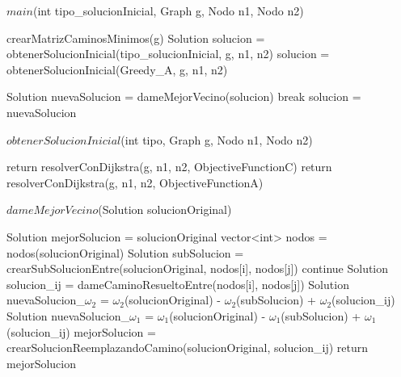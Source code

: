 \begin{algorithm}[H]
\caption{$main$(int tipo\_solucionInicial, Graph g, Nodo n1, Nodo n2)}
\begin{algorithmic}[1]
  \State crearMatrizCaminosMinimos(g)
  \State Solution solucion = obtenerSolucionInicial(tipo\_solucionInicial, g, n1, n2)
    solucion = obtenerSolucionInicial(Greedy\_A, g, n1, n2)
  \EndIf
  
    	\State Solution nuevaSolucion = dameMejorVecino(solucion)
		\State break	
	\EndIf    
	\State solucion = nuevaSolucion	
    \EndWhile
  \EndIf
\end{algorithmic}
\end{algorithm}

\begin{algorithm}[H]
\caption{$obtenerSolucionInicial$(int tipo, Graph g, Nodo n1, Nodo n2)}
\begin{algorithmic}[1]
	\State return resolverConDijkstra(g, n1, n2, ObjectiveFunctionC)
  \EndIf
  \State return resolverConDijkstra(g, n1, n2, ObjectiveFunctionA)
\end{algorithmic}
\end{algorithm}

\begin{algorithm}[H]
\caption{$dameMejorVecino$(Solution solucionOriginal)}
\begin{algorithmic}[1]	
	  \State Solution mejorSolucion = solucionOriginal
	  \State vector<int> nodos = nodos(solucionOriginal)
			\State Solution subSolucion = crearSubSolucionEntre(solucionOriginal, nodos[i], nodos[j])
				\State continue
			\EndIf
			\State Solution solucion\_ij = dameCaminoResueltoEntre(nodos[i], nodos[j])
			\State Solution nuevaSolucion\_$\omega_2$ = $\omega_2$(solucionOriginal) - $\omega_2$(subSolucion) + $\omega_2$(solucion\_ij)
			\State Solution nuevaSolucion\_$\omega_1$ = $\omega_1$(solucionOriginal) - $\omega_1$(subSolucion) + $\omega_1$(solucion\_ij)			
				\State mejorSolucion = crearSolucionReemplazandoCamino(solucionOriginal, solucion\_ij)
			\EndIf
		\EndFor
	\EndFor
	\State return mejorSolucion
\end{algorithmic}
\end{algorithm}

